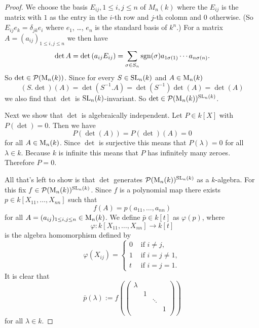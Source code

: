 \begin{proof}
 We choose the basis $E_{ij}, 1 \leq i,j \leq n$ of $M_n(k)$ where the $E_{ij}$ is the matrix with $1$ as the entry in the $i$-th row and $j$-th colomn and $0$ otherwise. (So $E_{ij} e_k = \delta_{jk}e_i$ where $e_1$, \dots, $e_n$ is the standard basis of $k^n$.)  For a matrix $A = (a_{ij})_{1 \leq i,j \leq n}$ we then have
 \[
  \det A
  = \det\left( a_{ij} E_{ij}\right)
  = \sum_{\sigma \in S_n} \operatorname{sgn}(\sigma) a_{1 \sigma(1)} \dotsm a_{n \sigma(n)}.
 \]
 So $\det \in \mathcal{P}(\operatorname{M}_n(k))$. Since for every $S \in \operatorname{SL}_n(k)$ and $A \in \operatorname{M}_n(k)$
 \[
  (S.\det)(A) = \det\left(S^{-1}.A\right) = \det\left(S^{-1}\right) \det(A) = \det(A)
 \]
 we also find that $\det$ is $\operatorname{SL}_n(k)$-invariant. So $\det \in \mathcal{P}(\operatorname{M}_n(k))^{\operatorname{SL}_n(k)}$.
 
 Next we show that $\det$ is algebraically independent. Let $P \in k[X]$ with $P(\det) = 0$. Then we have
 \[
  P(\det(A)) = P(\det)(A) = 0
 \]
 for all $A \in \operatorname{M}_n(k)$. Since $\det$ is surjective this means that $P(\lambda) = 0$ for all $\lambda \in k$. Because $k$ is infinite this means that $P$ has infinitely many zeroes. Therefore $P = 0$.
 
 All that’s left to show is that $\det$ generates $\mathcal{P}(\operatorname{M}_n(k))^{\operatorname{SL}_n(k)}$ as a $k$-algebra. For this fix $f \in \mathcal{P}(\operatorname{M}_n(k))^{\operatorname{SL}_n(k)}$. Since $f$ is a polynomial map there exists $p \in k[X_{11}, \dotsc, X_{nn}]$ such that
 \[
  f(A) = p(a_{11}, \dotsc, a_{nn})
 \]
 for all $A = (a_{ij})_{1 \leq i,j \leq n} \in \operatorname{M}_n(k)$. We define $\bar{p} \in k[t]$ as $\varphi(p)$, where
 \[
  \varphi \colon k[X_{11}, \dotsc, X_{nn}] \to k[t]
 \] 
 is the algebra homomorphism defined by 
 \[
  \varphi(X_{ij}) =
  \begin{cases}
   0 & \text{ if } i \neq j, \\
   1 & \text{ if } i = j \neq 1, \\
   t & \text{ if } i = j = 1.
  \end{cases}
 \]
 It is clear that
 \[
  \bar{p}(\lambda) :=
  f\left(
   \begin{pmatrix}
    \lambda &   &        &   \\
            & 1 &        &   \\
            &   & \ddots &   \\
            &   &        & 1 \\
   \end{pmatrix}
  \right)
 \]
 for all $\lambda \in k$.
 

\end{proof}
